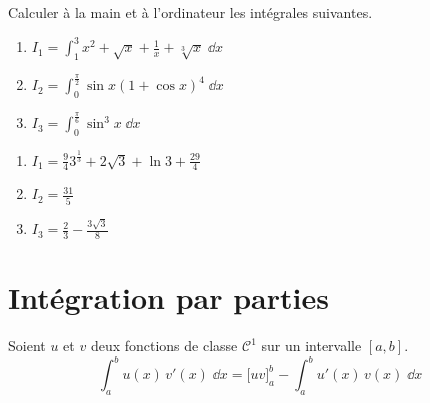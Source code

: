 \begin{frame}
\begin{tp}
Calculer à la main et à l'ordinateur les intégrales suivantes.
\begin{enumerate}
  \item $\displaystyle I_1 = \int_1^3 x^2 + \sqrt{x} + \frac1x + \sqrt[3]{x} \; \dd x$
  \item $\displaystyle I_2 = \int_0^\frac{\pi}{2} \sin x (1+\cos x)^4 \; \dd x$
  \item $\displaystyle I_3 = \int_0^{\frac\pi6} \sin^3 x \; \dd x$
\end{enumerate}
\end{tp}

\pause
\begin{enumerate}
\item {} 

\pause

$I_1 = \frac94 3^{\frac13} + 2\sqrt3 + \ln 3 + \frac{29}{4}$

\pause

\item {} \quad $I_2 = \frac{31}{5}$

\pause

\item {} \quad $I_3 = \frac23 - \frac{3\sqrt{3}}{8}$

\end{enumerate}

\end{frame}

\section{Intégration par parties}

\begin{frame}

\begin{theoreme}
Soient $u$ et $v$ deux fonctions de classe $\mathcal{C}^1$ sur un intervalle $[a,b]$.
$$\int_a^b u(x) \, v'(x)\;\dd x= \big[uv\big]_a^b - \int_a^b u'(x) \, v(x)\;\dd x$$
\end{theoreme} 

\end{frame}



